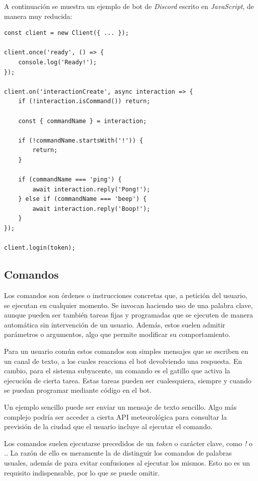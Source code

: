 A continuación se muestra un ejemplo de bot de \textit{Discord} escrito en \textit{JavaScript}, de manera muy reducida:

\begin{lstlisting}
const client = new Client({ ... });

client.once('ready', () => {
    console.log('Ready!');
});

client.on('interactionCreate', async interaction => {
    if (!interaction.isCommand()) return;

    const { commandName } = interaction;
    
    if (!commandName.startsWith('!')) {
    	return;
    }

    if (commandName === 'ping') {
        await interaction.reply('Pong!');
    } else if (commandName === 'beep') {
        await interaction.reply('Boop!');
    }
});

client.login(token);
\end{lstlisting}


\subsection{Comandos}
\label{sec:comandos}

Los comandos son órdenes o instrucciones concretas que, a petición del usuario, se ejecutan en cualquier momento. Se invocan haciendo uso de una palabra clave, aunque pueden ser también tareas fijas y programadas que se ejecuten de manera automática sin intervención de un usuario. Además, estos suelen admitir parámetros o argumentos, algo que permite modificar su comportamiento.

Para un usuario común estos comandos son simples mensajes que se escriben en un canal de texto, a los cuales reacciona el bot devolviendo una respuesta. En cambio, para el sistema subyacente, un comando es el gatillo que activa la ejecución de cierta tarea. Estas tareas pueden ser cualesquiera, siempre y cuando se puedan programar mediante código en el bot.

Un ejemplo sencillo puede ser enviar un mensaje de texto sencillo. Algo más complejo podría ser acceder a cierta API meteorológica para consultar la previsión de la ciudad que el usuario incluye al ejecutar el comando.

Los comandos suelen ejecutarse precedidos de un \textit{token} o carácter clave, como \textit{!} o \textit{.}. La razón de ello es meramente la de distinguir los comandos de palabras usuales, además de para evitar confusiones al ejecutar los mismos. Esto no es un requisito indispensable, por lo que se puede omitir.

